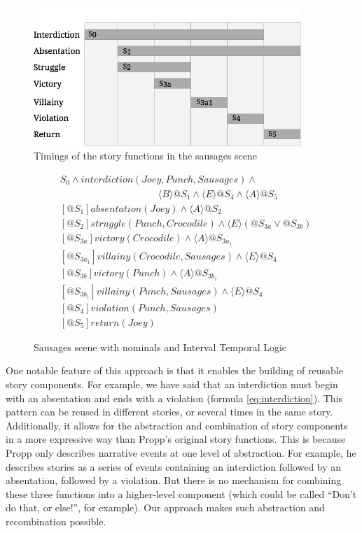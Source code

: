 \documentclass{llncs}
\begin{document}
\begin{figure}[!t]
  \centering
    \centerline{\includegraphics[width=0.9\textwidth]{durations.png}}
  \caption{Timings of the story functions in the sausages scene}\label{fig:durations}
\end{figure}
\begin{figure}[]
\begin{align}
  &S_{0} \land \mathit{interdiction(Joey, Punch, Sausages)} \land\nonumber\\
  &\qquad\qquad\qquad\qquad\qquad\langle B \rangle @S_{1} \land \langle E \rangle @S_{4} \land \langle A \rangle @S_{5}\label{eq:interdiction}\\
  &[@S_{1}] \mathit{absentation(Joey)} \land \langle A \rangle @S_{2}\label{eq:absentation}\\
  &[@S_{2}] \mathit{struggle(Punch, Crocodile)} \land \langle E \rangle (@S_{3a} \lor @S_{3b})\label{eq:struggle}\\
  &[@S_{3a}] \mathit{victory(Crocodile)} \land \langle A \rangle @S_{3a_1}\\
  &[@S_{3a_1}] \mathit{villainy(Crocodile, Sausages)} \land \langle E \rangle @S_{4}\\
  &[@S_{3b}] \mathit{victory(Punch)} \land \langle A \rangle @S_{3b_1}\\
  &[@S_{3b_1}] \mathit{villainy(Punch, Sausages)} \land \langle E \rangle @S_{4}\\
  &[@S_{4}] \mathit{violation(Punch, Sausages)}\\
  &[@S_{5}] \mathit{return(Joey)}
\end{align}
\caption{Sausages scene with nominals and Interval Temporal Logic}\label{fig:situations}
\end{figure}

One notable feature of this approach is that it enables the building of reusable story components. For example, we have said that an interdiction must begin with an absentation and ends with a violation (formula \ref{eq:interdiction}). This pattern can be reused in different stories, or several times in the same story. Additionally, it allows for the abstraction and combination of story components in a more expressive way than Propp's original story functions. This is because Propp only describes narrative events at one level of abstraction. For example, he describes stories as a series of events containing an interdiction followed by an absentation, followed by a violation. But there is no mechanism for combining these three functions into a higher-level component (which could be called ``Don't do that, or else!'', for example). Our approach makes such abstraction and recombination possible.
\end{document}
